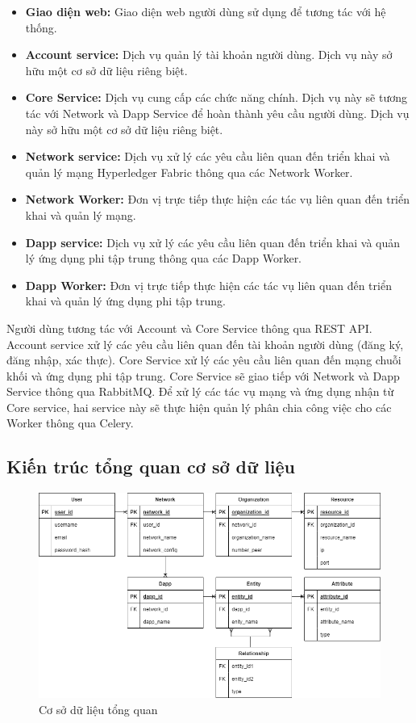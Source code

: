 \documentclass[../DoAn.tex]{subfiles}
\begin{document}
\begin{itemize}
    \item \textbf{Giao diện web:} Giao diện web người dùng sử dụng để tương tác với hệ thống.
    \item \textbf{Account service:} Dịch vụ quản lý tài khoản người dùng. Dịch vụ này sở hữu một cơ sở dữ liệu riêng biệt.
    \item \textbf{Core Service:} Dịch vụ cung cấp các chức năng chính. Dịch vụ này sẽ tương tác với Network và Dapp Service để hoàn thành yêu cầu người dùng. Dịch vụ này sở hữu một cơ sở dữ liệu riêng biệt.
    \item \textbf{Network service:} Dịch vụ xử lý các yêu cầu liên quan đến triển khai và quản lý mạng Hyperledger Fabric thông qua các Network Worker.
    \item \textbf{Network Worker:} Đơn vị trực tiếp thực hiện các tác vụ liên quan đến triển khai và quản lý mạng.
    \item \textbf{Dapp service:} Dịch vụ xử lý các yêu cầu liên quan đến triển khai và quản lý ứng dụng phi tập trung thông qua các Dapp Worker.
    \item \textbf{Dapp Worker:} Đơn vị trực tiếp thực hiện các tác vụ liên quan đến triển khai và quản lý ứng dụng phi tập trung.
\end{itemize}

Người dùng tương tác với Account và Core Service thông qua REST API. Account
service xử lý các yêu cầu liên quan đến tài khoản người dùng (đăng ký, đăng
nhập, xác thực). Core Service xử lý các yêu cầu liên quan đến mạng chuỗi khối
và ứng dụng phi tập trung. Core Service sẽ giao tiếp với Network và Dapp
Service thông qua RabbitMQ. Để xử lý các tác vụ mạng và ứng dụng nhận từ Core
service, hai service này sẽ thực hiện quản lý phân chia công việc cho các
Worker thông qua Celery.

\subsection{Kiến trúc tổng quan cơ sở dữ liệu}

\begin{figure}[H]
    \centering
    \includegraphics[width=0.75\linewidth]{Hinhve/DoAn-CSDLTongQuan.drawio.png}
    \caption{Cơ sở dữ liệu tổng quan}
    \label{fig:overal_database}
\end{figure}
\end{document}
